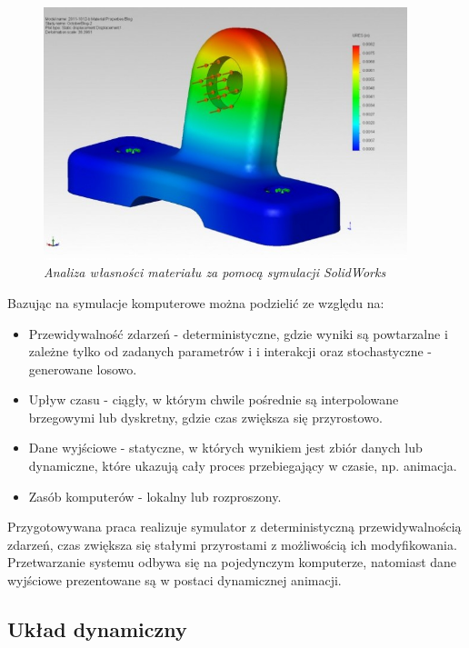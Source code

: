 \documentclass[12pt, oneside]{report}
\theoremstyle{definition}
\begin{document}
\begin{figure}[H]
	\centering
		\includegraphics[width = 300pt]{EngineeringSimulation} 
		\caption{\textit{Analiza własności materiału za pomocą symulacji SolidWorks \cite{EngineeringSimulation}}}
\label{EngineeringSimulationImage}
\end{figure}

\newpage
Bazując na \cite{WikiSymulacja} symulacje komputerowe można podzielić ze względu na:
\begin{itemize}
\item Przewidywalność zdarzeń - deterministyczne, gdzie wyniki są powtarzalne i zależne tylko od zadanych parametrów i i interakcji oraz stochastyczne - generowane losowo. 
\item Upływ czasu - ciągły, w którym chwile pośrednie są interpolowane brzegowymi lub dyskretny, gdzie czas zwiększa się przyrostowo.
\item Dane wyjściowe - statyczne, w których wynikiem jest zbiór danych lub dynamiczne, które ukazują cały proces przebiegający w czasie, np. animacja.
\item Zasób komputerów - lokalny lub rozproszony.
\end{itemize}

Przygotowywana praca realizuje symulator z deterministyczną przewidywalnością zdarzeń, czas zwiększa się stałymi przyrostami z możliwością ich modyfikowania. Przetwarzanie systemu odbywa się na pojedynczym komputerze, natomiast dane wyjściowe prezentowane są w postaci dynamicznej animacji.

\subsection{Układ dynamiczny}
\end{document}
